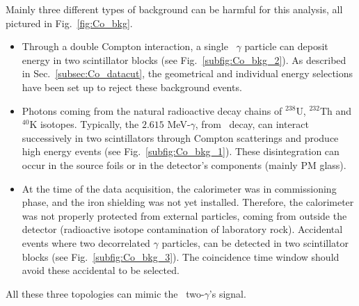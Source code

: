 Mainly three different types of background can be harmful for this analysis, all pictured in Fig.~\ref{fig:Co_bkg}.
\begin{itemize}
\item Through a double Compton interaction, a single \Co\ $\gamma$ particle can deposit energy in two scintillator blocks (see Fig.~\ref{subfig:Co_bkg_2}).
As described in Sec.~\ref{subsec:Co_datacut}, the geometrical and individual energy selections have been set up to reject these background events.
\item Photons coming from the natural radioactive decay chains of $^{238}$U, $^{232}$Th and $^{40}$K isotopes.
Typically, the $2.615$ MeV-$\gamma$, from \Tl\ decay, can interact successively in two scintillators through Compton scatterings and produce high energy events (see Fig.~\ref{subfig:Co_bkg_1}).
These disintegration can occur in the source foils or in the detector's components (mainly PM glass).
\item At the time of the data acquisition, the calorimeter was in commissioning phase, and the iron shielding was not yet installed.
Therefore, the calorimeter was not properly protected from external particles, coming from outside the detector (radioactive isotope contamination of laboratory rock).
Accidental events where two decorrelated $\gamma$ particles, can be detected in two scintillator blocks (see Fig.~\ref{subfig:Co_bkg_3}).
The coincidence time window should avoid these accidental to be selected.
\end{itemize}
All these three topologies can mimic the \Co\ two-$\gamma$'s signal.
